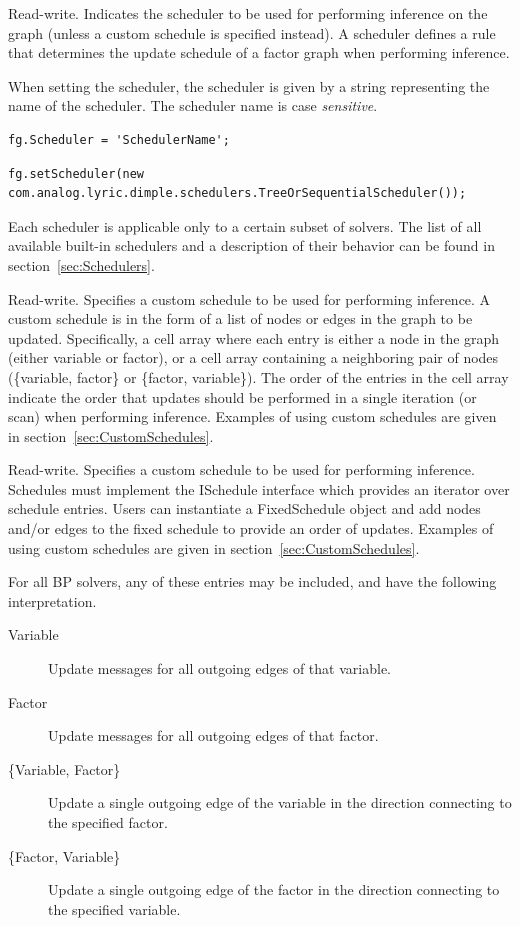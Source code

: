 \label{sec:FactorGraph.Scheduler}

Read-write.  Indicates the scheduler to be used for performing inference on the graph (unless a custom schedule is specified instead).  A scheduler defines a rule that determines the update schedule of a factor graph when performing inference.

When setting the scheduler, the scheduler is given by a string representing the name of the scheduler.  The scheduler name is case \emph{sensitive}.

\ifmatlab
\begin{lstlisting}
fg.Scheduler = 'SchedulerName';
\end{lstlisting}
\fi

\ifjava
\begin{lstlisting}
fg.setScheduler(new com.analog.lyric.dimple.schedulers.TreeOrSequentialScheduler());
\end{lstlisting}
\fi

Each scheduler is applicable only to a certain subset of solvers.  The list of all available built-in schedulers and a description of their behavior can be found in section~\ref{sec:Schedulers}.

\label{sec:FactorGraph.Schedule}

\ifmatlab
Read-write.  Specifies a custom schedule to be used for performing inference.  A custom schedule is in the form of a list of nodes or edges in the graph to be updated.  Specifically, a cell array where each entry is either a node in the graph (either variable or factor), or a cell array containing a neighboring pair of nodes (\{variable, factor\} or \{factor, variable\}).  The order of the entries in the cell array indicate the order that updates should be performed in a single iteration (or scan) when performing inference.  Examples of using custom schedules are given in section~\ref{sec:CustomSchedules}.
\fi

\ifjava
Read-write.  Specifies a custom schedule to be used for performing inference.  Schedules must implement the ISchedule interface which provides an iterator over schedule entries.  Users can instantiate a FixedSchedule object and add nodes and/or edges to the fixed schedule to provide an order of updates.  Examples of using custom schedules are given in section~\ref{sec:CustomSchedules}.
\fi

For all BP solvers, any of these entries may be included, and have the following interpretation.

\ifmatlab
\begin{description}
\item[Variable] Update messages for all outgoing edges of that variable.
\item[Factor] Update messages for all outgoing edges of that factor.
\item[\{Variable, Factor\}] Update a single outgoing edge of the variable in the direction connecting to the specified factor.
\item[\{Factor, Variable\}] Update a single outgoing edge of the factor in the direction connecting to the specified variable.
\end{description}
\fi

